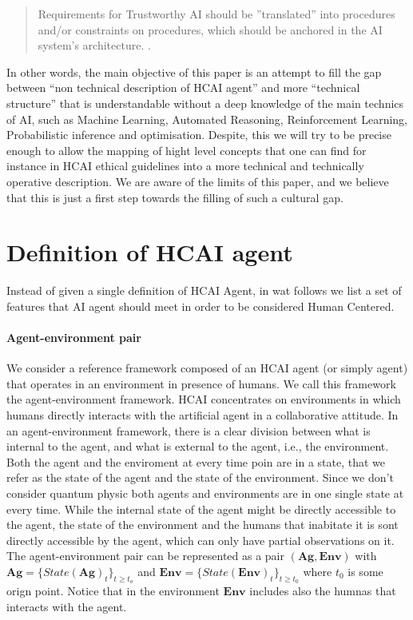 \begin{quote}
Requirements for Trustworthy AI should be ''translated'' into
procedures and/or constraints on procedures, which should be anchored
in the AI system’s architecture. \cite[page 21]{eu-ethical-guidelines}.
\end{quote}

In other words, the main objective of this paper is an attempt to fill
the gap between ``non technical description of HCAI agent'' and more
``technical structure'' that is understandable without a deep
knowledge of the main technics of AI, such as Machine Learning,
Automated Reasoning, Reinforcement Learning, Probabilistic inference
and optimisation.  Despite, this we will try to be precise enough to
allow the mapping of hight level concepts that one can find for
instance in HCAI ethical guidelines into a more technical and
technically operative description.  We are aware of the limits of this
paper, and we believe that this is just a first step towards the
filling of such a cultural gap.

\section{Definition of HCAI agent}
Instead of given a single definition of HCAI Agent, in wat follows we
list a set of features that AI agent should meet in order to be
considered Human Centered.

\paragraph{Agent-environment pair}
\def\agent{\mathbf{Ag}}
\def\agentState{State(\agent)}
\def\environment{\mathbf{Env}}
\def\environmentState{State(\environment)}

We consider a reference framework composed of an HCAI agent (or simply
agent) that operates in an environment in presence of humans. We call
this framework the agent-environment framework. HCAI concentrates on
environments in which humans directly interacts with the artificial
agent in a collaborative attitude.  In an agent-environment framework,
there is a clear division between what is internal to the agent, and
what is external to the agent, i.e., the environment.
Both the agent and the enviroment at every time poin are in a state,
that we refer as the state of the agent and the state of the
environment. Since we don't consider quantum physic both agents and
environments are in one single state at every time. While the internal
state of the agent might be directly accessible to the agent, the
state of the environment and the humans that inabitate it is sont
directly accessible by the agent, which can only have partial
observations on it.
The agent-environment pair can be represented as a pair $(\agent,\environment)$ with
$\agent=\{\agentState_t\}_{t\geq t_o}$ and $\environment = \{\environmentState_t\}_{t\geq t_0}$ where $t_0$ is
    some orign point. Notice that in the environment $\environment$
    includes also the humnas that interacts with the agent.

